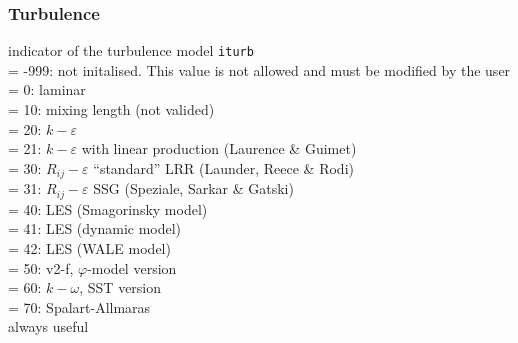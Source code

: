\subsubsection{Turbulence}

{indicator of the turbulence model {\tt iturb}\\
\hspace*{1.3cm}= -999: not initalised. This value is not allowed and
must be modified by the user\\
\hspace*{1.3cm}= 0: laminar\\
\hspace*{1.3cm}= 10: mixing length (not valided)\\
\hspace*{1.3cm}= 20: $k-\varepsilon$\\
\hspace*{1.3cm}= 21: $k-\varepsilon$ with linear production (Laurence \& Guimet)\\
\hspace*{1.3cm}= 30: $R_{ij}-\varepsilon$ ``standard'' LRR (Launder, Reece \& Rodi)\\
\hspace*{1.3cm}= 31: $R_{ij}-\varepsilon$ SSG (Speziale, Sarkar \& Gatski)\\
\hspace*{1.3cm}= 40: LES (Smagorinsky model) \\
\hspace*{1.3cm}= 41: LES (dynamic model) \\
\hspace*{1.3cm}= 42: LES (WALE model) \\
\hspace*{1.3cm}= 50: v2-f, $\varphi$-model version\\
\hspace*{1.3cm}= 60: $k-\omega$, SST version \\
\hspace*{1.3cm}= 70: Spalart-Allmaras \\
always useful}

